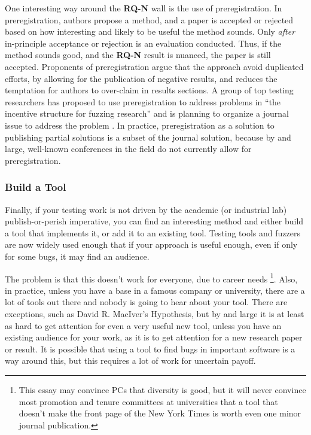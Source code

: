 \documentclass[sigplan,screen]{acmart}
\begin{document}
One interesting way around the {\bf RQ-N} wall is the use of
preregistration.  In preregistration, authors propose a method, and
a paper is accepted or rejected based on how interesting and likely to
be useful the method sounds.  Only \emph{after} in-principle
acceptance or rejection is an evaluation conducted.  Thus, if the
method sounds good, and the {\bf RQ-N} result is nuanced, the paper is
still accepted.  Proponents of preregistration argue that the approach
avoid duplicated efforts, by allowing for the publication of negative
results, and reduces the temptation for authors to over-claim in
results sections.  A group of top testing researchers has proposed to
use preregistration to address problems in ``the incentive structure
for fuzzing research'' and is planning to organize a journal issue to
address the problem \cite{special}.  In practice, preregistration as a solution to
publishing partial solutions is a subset of the journal solution,
because by and large, well-known conferences in the field do not currently allow
for preregistration.


\subsubsection{Build a Tool}

Finally, if your testing work is not driven by the academic (or
industrial lab) publish-or-perish imperative, you can find an
interesting method and either build a tool that implements it, or add
it to an existing tool.  Testing tools and fuzzers are now widely used
enough that if your approach is useful enough, even if only for some
bugs, it may find an audience.

The problem is that this doesn't work for everyone, due to career
needs \footnote{This essay may convince PCs that diversity is good,
  but it will never convince most promotion and tenure committees at
  universities that a tool that doesn't make the front page of the New
  York Times is worth even one minor journal publication.}.  Also, in practice,
unless you have a base in a famous company or university, there are a
lot of tools out there and nobody is going to hear about your tool.
There are exceptions, such as David R. MacIver's Hypothesis, but by
and large it is at least as hard to get attention for even a very
useful new tool, unless you have an existing audience for your work,
as it is to get attention for a new research paper or result.  It is
possible that using a tool to find bugs in important software is a way
around this, but this requires a lot of work for uncertain payoff.
\end{document}
